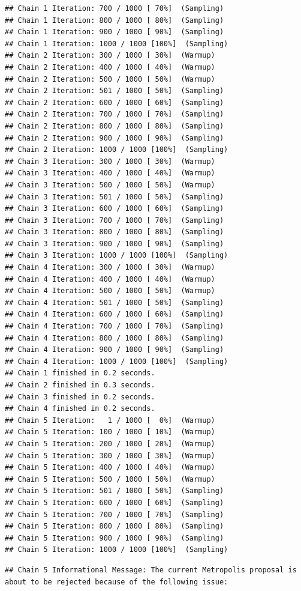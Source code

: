 \documentclass[
]{book}
\begin{document}
\begin{verbatim}
## Chain 1 Iteration: 700 / 1000 [ 70%]  (Sampling) 
## Chain 1 Iteration: 800 / 1000 [ 80%]  (Sampling) 
## Chain 1 Iteration: 900 / 1000 [ 90%]  (Sampling) 
## Chain 1 Iteration: 1000 / 1000 [100%]  (Sampling) 
## Chain 2 Iteration: 300 / 1000 [ 30%]  (Warmup) 
## Chain 2 Iteration: 400 / 1000 [ 40%]  (Warmup) 
## Chain 2 Iteration: 500 / 1000 [ 50%]  (Warmup) 
## Chain 2 Iteration: 501 / 1000 [ 50%]  (Sampling) 
## Chain 2 Iteration: 600 / 1000 [ 60%]  (Sampling) 
## Chain 2 Iteration: 700 / 1000 [ 70%]  (Sampling) 
## Chain 2 Iteration: 800 / 1000 [ 80%]  (Sampling) 
## Chain 2 Iteration: 900 / 1000 [ 90%]  (Sampling) 
## Chain 2 Iteration: 1000 / 1000 [100%]  (Sampling) 
## Chain 3 Iteration: 300 / 1000 [ 30%]  (Warmup) 
## Chain 3 Iteration: 400 / 1000 [ 40%]  (Warmup) 
## Chain 3 Iteration: 500 / 1000 [ 50%]  (Warmup) 
## Chain 3 Iteration: 501 / 1000 [ 50%]  (Sampling) 
## Chain 3 Iteration: 600 / 1000 [ 60%]  (Sampling) 
## Chain 3 Iteration: 700 / 1000 [ 70%]  (Sampling) 
## Chain 3 Iteration: 800 / 1000 [ 80%]  (Sampling) 
## Chain 3 Iteration: 900 / 1000 [ 90%]  (Sampling) 
## Chain 3 Iteration: 1000 / 1000 [100%]  (Sampling) 
## Chain 4 Iteration: 300 / 1000 [ 30%]  (Warmup) 
## Chain 4 Iteration: 400 / 1000 [ 40%]  (Warmup) 
## Chain 4 Iteration: 500 / 1000 [ 50%]  (Warmup) 
## Chain 4 Iteration: 501 / 1000 [ 50%]  (Sampling) 
## Chain 4 Iteration: 600 / 1000 [ 60%]  (Sampling) 
## Chain 4 Iteration: 700 / 1000 [ 70%]  (Sampling) 
## Chain 4 Iteration: 800 / 1000 [ 80%]  (Sampling) 
## Chain 4 Iteration: 900 / 1000 [ 90%]  (Sampling) 
## Chain 4 Iteration: 1000 / 1000 [100%]  (Sampling) 
## Chain 1 finished in 0.2 seconds.
## Chain 2 finished in 0.3 seconds.
## Chain 3 finished in 0.2 seconds.
## Chain 4 finished in 0.2 seconds.
## Chain 5 Iteration:   1 / 1000 [  0%]  (Warmup) 
## Chain 5 Iteration: 100 / 1000 [ 10%]  (Warmup) 
## Chain 5 Iteration: 200 / 1000 [ 20%]  (Warmup) 
## Chain 5 Iteration: 300 / 1000 [ 30%]  (Warmup) 
## Chain 5 Iteration: 400 / 1000 [ 40%]  (Warmup) 
## Chain 5 Iteration: 500 / 1000 [ 50%]  (Warmup) 
## Chain 5 Iteration: 501 / 1000 [ 50%]  (Sampling) 
## Chain 5 Iteration: 600 / 1000 [ 60%]  (Sampling) 
## Chain 5 Iteration: 700 / 1000 [ 70%]  (Sampling) 
## Chain 5 Iteration: 800 / 1000 [ 80%]  (Sampling) 
## Chain 5 Iteration: 900 / 1000 [ 90%]  (Sampling) 
## Chain 5 Iteration: 1000 / 1000 [100%]  (Sampling)
\end{verbatim}

\begin{verbatim}
## Chain 5 Informational Message: The current Metropolis proposal is about to be rejected because of the following issue:
\end{verbatim}
\end{document}
